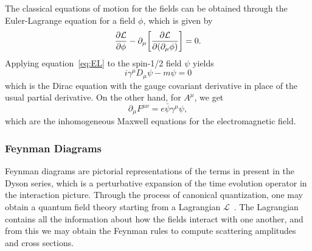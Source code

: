The classical equations of motion for the fields can be obtained through the Euler-Lagrange equation for a field $\phi$, which is given by
\begin{equation}\label{eq:EL}
  \pdv{\mathcal{L}}{\phi}-\partial_\mu\bqty{\pdv{\mathcal{L}}{(\partial_\mu\phi)}}=0.
\end{equation}
Applying equation~\ref{eq:EL} to the spin-1/2 field $\psi$ yields
\begin{equation}
  i\gamma^\mu D_\mu\psi-m\psi=0
\end{equation}
which is the Dirac equation with the gauge covariant derivative in place of the usual partial derivative.
On the other hand, for $A^\mu$, we get
\begin{equation}
  \partial_\mu F^{\mu\nu}=e\bar{\psi}\gamma^\mu\psi,
\end{equation}
which are the inhomogeneous Maxwell equations for the electromagnetic field.

\subsubsection{Feynman Diagrams}

Feynman diagrams are pictorial representations of the terms in present in the Dyson series, which is a perturbative expansion of the time evolution operator in the interaction picture.
Through the process of canonical quantization, one may obtain a quantum field theory starting from a Lagrangian $\mathcal{L}$~\cite{Lancaster:1629337}.
The Lagrangian contains all the information about how the fields interact with one another, and from this we may obtain the Feynman rules to compute scattering amplitudes and cross sections.

